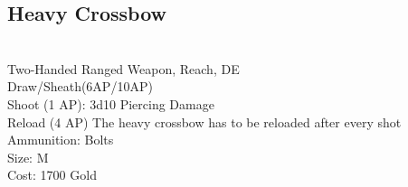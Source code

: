 \subsection{Heavy Crossbow}\label{weapon:heavyCrossbow}\\
Two-Handed Ranged Weapon,  Reach, DE\\
Draw/Sheath(6AP/10AP)\\
Shoot (1 AP): 3d10 Piercing Damage\\
Reload (4 AP) The heavy crossbow has to be reloaded after every shot\\
Ammunition: Bolts\\
Size: M\\
Cost: 1700 Gold\\